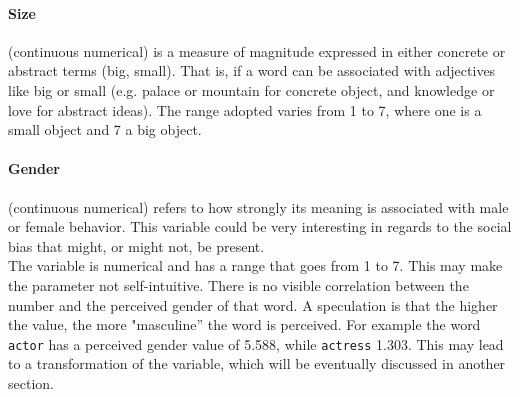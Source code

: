 \documentclass[a4paper,11pt,dvipsnames]{article}
\begin{document}

\paragraph{Size} (continuous numerical) is a measure of magnitude expressed in either concrete or abstract terms (big, small). That is, if a word can be associated with adjectives like big or small (e.g. palace or mountain for concrete object, and knowledge or love for abstract ideas). The range adopted varies from 1 to 7, where one is a small object and 7 a big object. 

\paragraph{Gender} (continuous numerical) refers to how strongly its meaning is associated with male or female behavior. This variable could be very interesting in regards to the social bias that might, or might not, be present. \\
The variable is numerical and has a range that goes from 1 to 7. 
This may make the parameter not self-intuitive. There is no visible correlation between the number and the perceived gender of that word. A speculation is that the higher the value, the more "masculine'' the word is perceived. For example the word \texttt{actor} has a perceived gender value of 5.588, while \texttt{actress} 1.303. This may lead to a transformation of the variable, which will be eventually discussed in another section.

\end{document}
